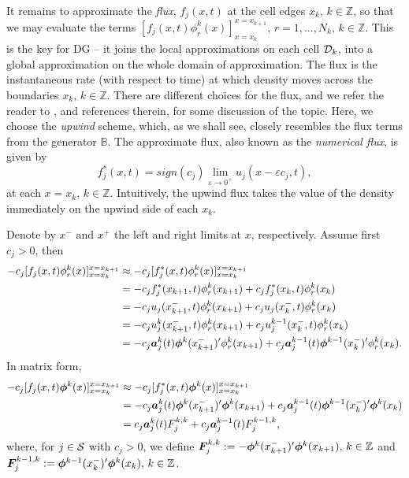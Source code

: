 It remains to approximate the \textit{flux}, \(f_j(x,t)\) at the cell edges \(x_k,\,k\in\mathbb Z\), so that we may evaluate the terms \([f_j(x,t)\phi_r^k(x)]_{x=x_k}^{x=x_{k+1}}\), \(r=1,...,N_k,\,k\in\mathbb Z\). This is the key for DG -- it joins the local approximations on each cell \(\mathcal{D}_k\), into a global approximation on the whole domain of approximation. The flux is the instantaneous rate (with respect to time) at which density moves across the boundaries \(x_k,\,k\in\mathbb Z\). There are different choices for the flux, and we refer the reader to \citep{c99,nodalDGBook}, and references therein, for some discussion of the topic. Here, we choose the \textit{upwind} scheme, which, as we shall see, closely resembles the flux terms from the generator \(\mathbb B\). The approximate flux, also known as the \textit{numerical flux}, is given by 
\[f^*_j(x,t) = sign(c_j)\lim_{\varepsilon\to0^+}u_j(x-\varepsilon c_j,t),\]
at each \(x=x_k,\,k\in\mathbb Z\). 
Intuitively, the upwind flux takes the value of the density immediately on the upwind side of each \(x_k\). 

Denote by \(x^-\) and \(x^+\) the left and right limits at \(x\), respectively. Assume first \(c_j>0\), then 
\begin{align*}
	-c_j[f_j(x,t)\phi_r^k(x)]_{x=x_k}^{x=x_{k+1}} & \approx -c_j[f_j^*(x,t)\phi_r^k(x)]_{x=x_k}^{x=x_{k+1}}
	\\& = -c_jf_j^*(x_{k+1},t)\phi_r^k(x_{k+1}) + c_jf_j^*(x_{k},t)\phi_r^k(x_{k})
	\\& = -c_ju_j(x_{k+1}^-,t)\phi_r^k(x_{k+1}) + c_ju_j(x_{k}^-,t)\phi_r^k(x_{k})
	\\& = -c_ju_j^k(x_{k+1}^-,t)\phi_r^k(x_{k+1}) + c_ju_j^{k-1}(x_{k}^-,t)\phi_r^k(x_{k})
	\\& = -c_j\boldsymbol a_j^k(t)\boldsymbol \phi^k(x_{k+1}^-)'{}\phi_r^k(x_{k+1}) + c_j\boldsymbol a_j^{k-1}(t)\boldsymbol \phi^{k-1}(x_{k}^-)'{}\phi_r^k(x_{k}).
\end{align*}
In matrix form,  
\begin{align*}
	-c_j[f_j(x,t)\boldsymbol\phi^k(x)]_{x=x_k}^{x=x_{k+1}} & \approx -c_j[f_j^*(x,t)\boldsymbol\phi^k(x)]_{x=x_k}^{x=x_{k+1}}
	\\& = -c_j\boldsymbol a_j^k(t)\boldsymbol \phi^k(x_{k+1}^-)'{}\boldsymbol\phi^k(x_{k+1}) + c_j\boldsymbol a_j^{k-1}(t)\boldsymbol \phi^{k-1}(x_{k}^-)'{}\boldsymbol\phi^k(x_{k})
	\\& = c_j\boldsymbol a_j^k(t)F_j^{k,k}+c_j\boldsymbol a_j^{k-1}(t)F_j^{k-1,k},
\end{align*}
where, for \(j\in \mathcal{S}\) with \(c_j>0\), we define \(\boldsymbol F_j^{k,k} := -\boldsymbol \phi^k(x_{k+1}^-)'{}\boldsymbol\phi^k(x_{k+1}),\,k\in\mathbb Z\) and \(\boldsymbol F_j^{k-1,k} := \boldsymbol \phi^{k-1}(x_{k}^-)'{}\boldsymbol\phi^k(x_{k}),\,k\in\mathbb Z\).

